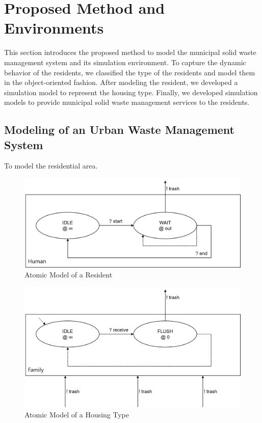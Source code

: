 \documentclass{scsSimAUDPaperFormat}
\begin{document}
\section{Proposed Method and Environments}

This section introduces the proposed method to model the municipal solid waste management system and its simulation environment. To capture the dynamic behavior of the residents, we classified the type of the residents and model them in the object-oriented fashion. After modeling the resident, we developed a simulation model to represent the housing type. Finally, we developed simulation models to provide municipal solid waste management services to the residents. 

\subsection{Modeling of an Urban Waste Management System}
To model the residential area. 
\begin{figure}[!h]
    \centering
    \includegraphics[width=1.0\columnwidth]{fig/human_model.png}
    \caption{Atomic Model of a Resident}
    \label{Fig:Humanmodel}
\end{figure}

\begin{figure}[!h]
    \centering
    \includegraphics[width=1.0\columnwidth]{fig/family_model.png}
    \caption{Atomic Model of a Housing Type}
    \label{Fig:Familymodel}
\end{figure}
\end{document}
